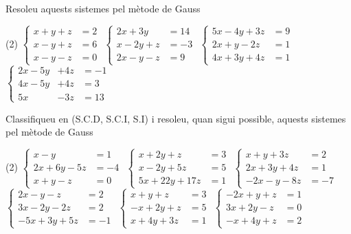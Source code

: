 \documentclass[11pt, a4paper, pdf]{article}
\begin{document}
\begin{mylist}
 

	\item Resoleu aquests sistemes pel mètode de Gauss
 \begin{tasks}(2)
	\task  $\left\{\begin{array}{ll} x+y+z&=2 \\ x-y+z&=6 \\ x-y-z&=0 \end{array}\right. $       
	\task  $\left\{\begin{array}{ll} 2x+3y&=14 \\ x-2y+z&=-3 \\ 2x-y-z&=9 \end{array}\right. $ 
	\task  $\left\{\begin{array}{ll} 5x-4y+3z&=9 \\ 2x+y-2z&=1 \\ 4x+3y+4z&=1 \end{array}\right. $        
	\task  $\left\{\begin{array}{lll} 2x-5y&+4z&=-1 \\ 4x-5y&+4z&=3 \\ 5x&-3z&=13 \end{array}\right. $ 
\end{tasks}
	
	
	\item Classifiqueu en (S.C.D, S.C.I, S.I) i resoleu, quan sigui possible, aquests sistemes pel mètode de Gauss
	\begin{tasks}(2)
		\task  $\left\{\begin{array}{ll} x-y&=1 \\ 2x+6y-5z&=-4 \\ x+y-z&=0 \end{array}\right. $       
		\task  $\left\{\begin{array}{ll} x+2y+z&=3 \\ x-2y+5z&=5 \\ 5x+22y+17z&=1 \end{array}\right. $ 
		\task  $\left\{\begin{array}{ll} x+y+3z&=2 \\ 2x+3y+4z&=1 \\ -2x-y-8z&=-7 \end{array}\right. $        
		\task  $\left\{\begin{array}{ll} 2x-y-z&=2 \\ 3x-2y-2z&=2 \\ -5x+3y+5z&=-1 \end{array}\right. $ 
		\task  $\left\{\begin{array}{ll} x+y+z&=3 \\ -x+2y+z&=5 \\ x+4y+3z&=1 \end{array}\right. $ 
		\task  $\left\{\begin{array}{ll} -2x+y+z&=1 \\ 3x+2y-z&=0 \\ -x+4y+z&=2 \end{array}\right. $ 
	\end{tasks}
	 

\end{mylist}
\end{document}
